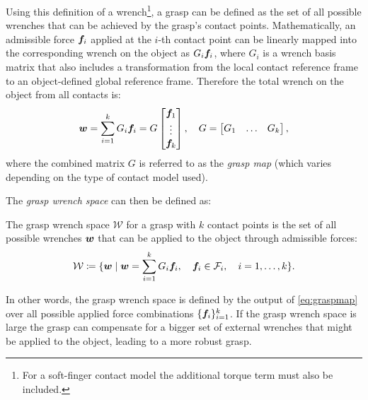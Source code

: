 Using this definition of a wrench\footnote[][2\baselineskip]{For a soft-finger contact model the additional torque term must also be included.}, a grasp can be defined as the set of all possible wrenches that can be achieved by the grasp's contact points. Mathematically, an admissible force $\bm{f}_i$ applied at the $i$-th contact point can be linearly mapped into the corresponding wrench on the object as $G_i\bm{f}_i$, where $G_i$ is a wrench basis matrix that also includes a transformation from the local contact reference frame to an object-defined global reference frame. Therefore the total wrench on the object from all contacts is:
\begin{equation} \label{eq:graspmap}
    \bm{w} = \sum_{i=1}^k G_i \bm{f}_i = G\begin{bmatrix} 
    \bm{f}_1 \\ \vdots \\ \bm{f}_k
    \end{bmatrix}, \quad G = \begin{bmatrix} 
    G_1 & \dots & G_k
    \end{bmatrix},
\end{equation}
where the combined matrix $G$ is referred to as the \textit{grasp map} (which varies depending on the type of contact model used).

The \textit{grasp wrench space} can then be defined as:
\begin{definition}
The grasp wrench space $\mathcal{W}$ for a grasp with $k$ contact points is the set of all possible wrenches $\bm{w}$ that can be applied to the object through admissible forces:
\begin{equation} \label{eq:graspwrenchspace}
\mathcal{W} \coloneqq \{\bm{w} \mid \bm{w} = \sum_{i=1}^k G_i \bm{f}_i, \quad \bm{f}_i \in \mathcal{F}_i, \quad i = 1,\dots,k\}.
\end{equation}
\end{definition}
In other words, the grasp wrench space is defined by the output of \eqref{eq:graspmap} over all possible applied force combinations $\{\bm{f}_i\}_{i=1}^k$.
If the grasp wrench space is large the grasp can compensate for a bigger set of external wrenches that might be applied to the object, leading to a more robust grasp.

